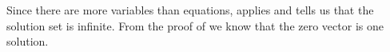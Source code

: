 Since there are more variables than equations,  applies and tells us that the solution set is infinite.  From the proof of  we know that the zero vector is one solution.